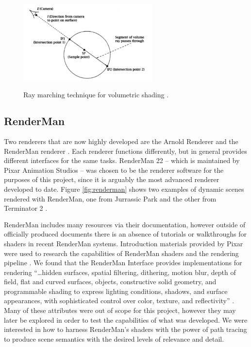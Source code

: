 \documentclass[conference]{IEEEtran}
\begin{document}
\begin{figure}[htbp]
\centering
{\includegraphics[width=7cm]{ray_marching.png}}
\caption{Ray marching technique for volumetric shading \cite{ray_marching}.}
\label{fig:ray_marching}
\end{figure}

\subsection{RenderMan}
Two renderers that are now highly developed are the Arnold Renderer \cite{arnold}
and the RenderMan renderer \cite{renderman_docs}. Each renderer
functions differently, but in general provides different interfaces for the same tasks.
RenderMan 22 -- which is maintained by Pixar Animation Studios --
was chosen to be the renderer software for the purposes of this project,
since it is arguably the most advanced renderer developed to date.
Figure \ref{fig:renderman} shows two examples of dynamic scenes rendered with RenderMan,
one from Jurrassic Park and the other from Terminator 2 \cite{renderman_pathtrace}.

RenderMan includes many resources via their documentation,
however outside of officially produced documents there is an absence of tutorials or
walkthroughs for shaders in recent RenderMan systems.
Introduction materials provided by Pixar were used to research the capabilities
of RenderMan shaders and the rendering pipeline \cite{renderman}.
We found that the RenderMan Interface provides implementations for rendering
``\dots hidden surfaces, spatial filtering, dithering, motion blur, depth of field,
flat and curved surfaces, objects, constructive solid geometry,
and programmable shading to express lighting conditions, shadows, and surface appearances,
with sophisticated control over color, texture, and reflectivity''
\cite{renderman_docs}.
Many of these attributes were out of scope
for this project, however they may later be explored in order to test the capabilities
of what was developed.
We were interested in how to harness RenderMan's shaders with the power of path tracing
to produce scene semantics with the desired levels of relevance and detail.
\end{document}

